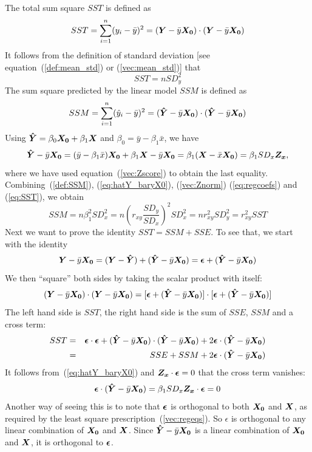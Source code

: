 \documentclass[11pt]{article}
\newcommand{\beq}{\begin{equation}}
\newcommand{\eeq}{\end{equation}}
\newcommand{\beqn}{\begin{eqnarray}}
\newcommand{\eeqn}{\end{eqnarray}}
\newcommand{\ve}[1]{\mbox{\boldmath $#1$}}
\begin{document}
The total sum square $SST$ is defined as 
\beq
  SST = \sum_{i=1}^n (y_i-\bar{y})^2 = (\ve{Y}-\bar{y} \ve{X_0}) \cdot (\ve{Y}-\bar{y} \ve{X_0})
\label{def:SST}
\eeq
It follows from the definition of standard deviation [see equation~(\ref{def:mean_std}) 
or (\ref{vec:mean_std})] that 
\beq
  SST = n SD_y^2 
\label{eq:SST}
\eeq
The sum square predicted by the linear model $SSM$ is defined as 
\beq
  SSM = \sum_{i=1}^n (\hat{y}_i-\bar{y})^2 = (\ve{\hat{Y}}-\bar{y}\ve{X_0})\cdot (\ve{\hat{Y}}-\bar{y}\ve{X_0})
\label{def:SSM}
\eeq
Using $\ve{\hat{Y}}=\beta_0 \ve{X_0}+\beta_1 \ve{X}$ and $\beta_0=\bar{y}-\beta_1\bar{x}$, we have 
\beq
  \ve{\hat{Y}}-\bar{y}\ve{X_0} = (\bar{y}-\beta_1\bar{x})\ve{X_0}+\beta_1 \ve{X} - \bar{y}\ve{X_0} 
= \beta_1 (\ve{X}-\bar{x}\ve{X_0}) = \beta_1 SD_x \ve{Z_x} ,
\label{eq:hatY_baryX0}
\eeq
where we have used equation~(\ref{vec:Zscore}) to obtain the last equality. Combining~(\ref{def:SSM}), 
(\ref{eq:hatY_baryX0}), (\ref{vec:Znorm}) (\ref{eq:regcoefs}) and (\ref{eq:SST}), we obtain 
\beq
  SSM = n \beta_1^2 SD_x^2 = n \left( r_{xy} \frac{SD_y}{SD_x}\right)^2 SD_x^2 = n r_{xy}^2 SD_y^2 
= r_{xy}^2 SST 
\label{eq:SSM}
\eeq 
Next we want to prove the identity $SST=SSM+SSE$. To see that, we start with the identity 
\[
  \ve{Y}-\bar{y}\ve{X_0} = (\ve{Y}-\ve{\hat{Y}}) + (\ve{\hat{Y}}-\bar{y}\ve{X_0})  
= \ve{\epsilon} + (\ve{\hat{Y}}-\bar{y}\ve{X_0})
\]
We then ``square'' both sides by taking the scalar product with itself: 
\[
  (\ve{Y}-\bar{y}\ve{X_0})\cdot (\ve{Y}-\bar{y}\ve{X_0}) = [\ve{\epsilon} + (\ve{\hat{Y}}-\bar{y}\ve{X_0})] 
\cdot [\ve{\epsilon} + (\ve{\hat{Y}}-\bar{y}\ve{X_0})] 
\]
The left hand side is $SST$, the right hand side is the sum of $SSE$, $SSM$ and a cross term: 
\beqn
  SST &=& \ve{\epsilon} \cdot \ve{\epsilon} + (\ve{\hat{Y}}-\bar{y}\ve{X_0})\cdot (\ve{\hat{Y}}-\bar{y}\ve{X_0}) 
+ 2 \ve{\epsilon} \cdot (\ve{\hat{Y}}-\bar{y}\ve{X_0}) \cr 
&=& SSE + SSM + 2 \ve{\epsilon} \cdot (\ve{\hat{Y}}-\bar{y}\ve{X_0}) \nonumber
\eeqn
It follows from~(\ref{eq:hatY_baryX0}) and $\ve{Z_x}\cdot \ve{\epsilon}=0$ that the 
cross term vanishes:
\[
  \ve{\epsilon} \cdot (\ve{\hat{Y}}-\bar{y}\ve{X_0}) = \beta_1 SD_x \ve{Z_x}\cdot \ve{\epsilon}=0 
\]
Another way of seeing this is to note that $\ve{\epsilon}$ is orthogonal to both $\ve{X_0}$ and 
$\ve{X}$, as required by the least square prescription~(\ref{vec:regeqs}). 
So $\epsilon$ is orthogonal to any linear combination of $\ve{X_0}$ and $\ve{X}$. 
Since $\ve{\hat{Y}}-\bar{y}\ve{X_0}$ is a linear combination of $\ve{X_0}$ and $\ve{X}$, 
it is orthogonal to $\ve{\epsilon}$. 
\end{document}
